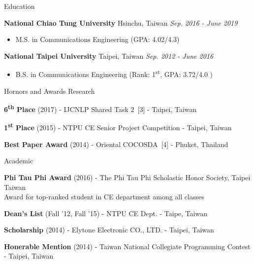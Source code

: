 \documentclass{resume} %
\newcommand{\ts}{\textsuperscript}
\begin{document}

\begin{rSection}{Education}

{\bf National Chiao Tung University} \hfill{Hsinchu, Taiwan} \hfill{\em Sep. 2016 - June 2019}
\begin{itemize} \item {M.S. in Communications Engineering (GPA: 4.02/4.3)} \end{itemize}
{\bf National Taipei University}\hspace*{2em} \hfill{Taipei, Taiwan} \hfill{\em Sep. 2012 - June 2016}
\begin{itemize} \item {B.S. in Communications Engineering (Rank: 1\ts{st}, GPA: 3.72/4.0 )} \end{itemize}
\end{rSection}


\begin{rSection}{Hornors and Awards}
    Research
    \begin{rSubsection}{}{}{}{}
    \item {\bf 6\ts{th} Place} (2017) - IJCNLP Shared Task 2~[3] - Taipei, Taiwan
    \item {\bf 1\ts{st} Place} (2015) - NTPU CE Senior Project Competition - Taipei, Taiwan
    \item {\bf Best Paper Award} (2014) - Oriental COCOSDA~[4] - Phuket, Thailand
    \end{rSubsection}
    Academic
    \begin{rSubsection}{}{}{}{}
    \item {\bf Phi Tau Phi Award} (2016) - The Phi Tau Phi Scholastic Honor Society, Taipei Taiwan \\
    Award for top-ranked student in CE department among all classes
    \item {\bf Dean's List} (Fall '12, Fall '15) - NTPU CE Dept. - Taipe, Taiwan
    \item {\bf Scholarship} (2014) - Elytone Electronic CO., LTD. - Taipei, Taiwan
    \item {\bf Honerable Mention} (2014) - Taiwan National Collegiate Programming Contest - Taipei, Taiwan
    \end{rSubsection}
    \end{rSection}
\end{document}
